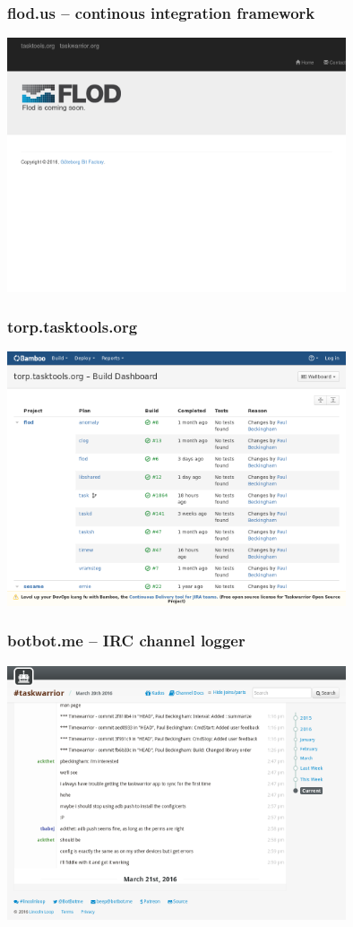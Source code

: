 \documentclass[t,handout]{beamer}
\begin{document}
\begin{frame}\frametitle{flod.us -- continous integration framework}
    \begin{center}
        \href{http://flod.us/}{\includegraphics[width=10cm,height=7.5cm]{flod-us.png}}
    \end{center}
\end{frame}

\begin{frame}\frametitle{torp.tasktools.org}
    \begin{center}
        \href{https://torp.tasktools.org}{\includegraphics[width=10cm,height=7.5cm]{torp-tasktools-org.png}}
    \end{center}
\end{frame}

\begin{frame}\frametitle{botbot.me -- IRC channel logger}
    \begin{center}
        \href{https://botbot.me/freenode/taskwarrior/}{\includegraphics[width=10cm,height=7.5cm]{botbot-me-taskwarrior.png}}
    \end{center}
\end{frame}
\end{document}
